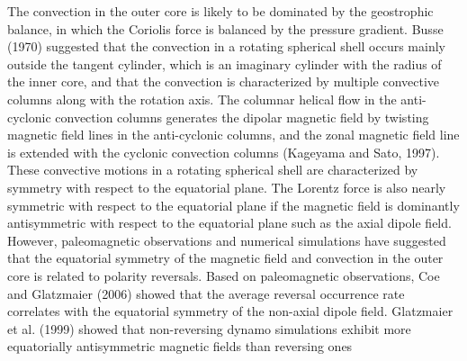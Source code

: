 The convection in the outer core is likely to be dominated by the geostrophic balance, in which the Coriolis force is balanced by the pressure gradient.
Busse (1970) 
suggested that the convection in a rotating spherical shell occurs mainly outside the tangent cylinder, which is an imaginary cylinder with the radius of the inner core, and that the convection is characterized by multiple convective columns along with the rotation axis. 
The columnar helical flow in the anti-cyclonic convection columns generates the dipolar magnetic field by twisting magnetic field lines in the anti-cyclonic columns, and the zonal magnetic field line is extended with the cyclonic convection columns (Kageyama and Sato, 1997). %
These convective motions in a rotating spherical shell are characterized by symmetry with respect to the equatorial plane.
The Lorentz force is also nearly symmetric with respect to the equatorial plane if the magnetic field is dominantly antisymmetric with respect to the equatorial plane such as the axial dipole field.
However, paleomagnetic observations and numerical simulations have suggested that the equatorial symmetry of the magnetic field and convection in the outer core is related to polarity reversals.
%
Based on paleomagnetic observations, Coe and Glatzmaier (2006) showed that the average reversal 
occurrence
rate correlates with the equatorial symmetry of the non-axial dipole field.
Glatzmaier et al. (1999) showed that non-reversing 
dynamo
simulations exhibit more equatorially antisymmetric magnetic fields than reversing ones 

